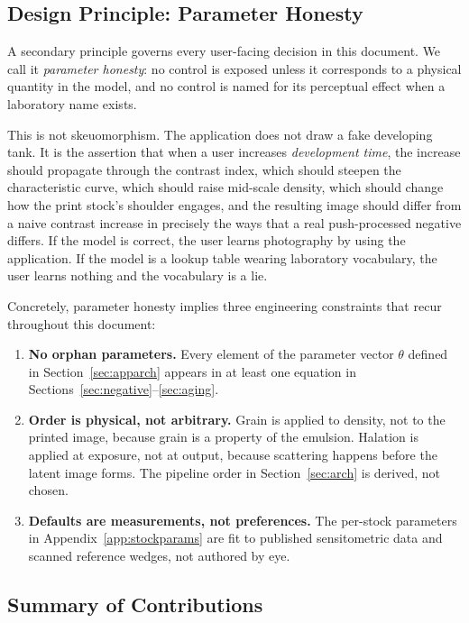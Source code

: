 \subsection{Design Principle: Parameter Honesty}

A secondary principle governs every user-facing decision in this document. We
call it \emph{parameter honesty}: no control is exposed unless it corresponds
to a physical quantity in the model, and no control is named for its perceptual
effect when a laboratory name exists.

This is not skeuomorphism. The application does not draw a fake developing
tank. It is the assertion that when a user increases \emph{development time},
the increase should propagate through the contrast index, which should steepen
the characteristic curve, which should raise mid-scale density, which should
change how the print stock's shoulder engages, and the resulting image should
differ from a naive contrast increase in precisely the ways that a real
push-processed negative differs. If the model is correct, the user learns
photography by using the application. If the model is a lookup table wearing
laboratory vocabulary, the user learns nothing and the vocabulary is a lie.

Concretely, parameter honesty implies three engineering constraints that
recur throughout this document:

\begin{enumerate}
\item \textbf{No orphan parameters.} Every element of the parameter vector
$\theta$ defined in Section~\ref{sec:apparch} appears in at least one equation
in Sections~\ref{sec:negative}--\ref{sec:aging}.
\item \textbf{Order is physical, not arbitrary.} Grain is applied to density,
not to the printed image, because grain is a property of the emulsion. Halation
is applied at exposure, not at output, because scattering happens before the
latent image forms. The pipeline order in Section~\ref{sec:arch} is derived,
not chosen.
\item \textbf{Defaults are measurements, not preferences.} The per-stock
parameters in Appendix~\ref{app:stockparams} are fit to published sensitometric
data and scanned reference wedges, not authored by eye.
\end{enumerate}

\subsection{Summary of Contributions}

